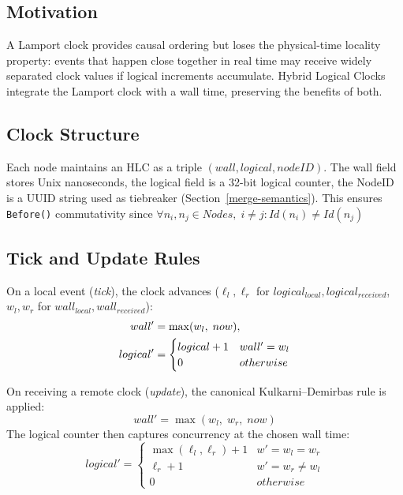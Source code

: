 \documentclass[conference]{IEEEtran}
\begin{document}
\subsection{Motivation}

A Lamport clock \cite{lamport1978} provides causal ordering but loses the physical-time
locality property: events that happen close together in real time may receive
widely separated clock values if logical increments accumulate. Hybrid Logical
Clocks \cite{kulkarni2014} integrate the Lamport clock with a wall time,
preserving the benefits of both.

\subsection{Clock Structure}

{\color{violet}Each node maintains an HLC as a triple $(wall, logical, nodeID)$}. The wall field stores
Unix nanoseconds, the logical field is a 32-bit logical counter, the NodeID is a UUID
string used as tiebreaker (Section~\ref{merge-semantics}). This ensures \texttt{Before()}
commutativity since $\forall n_i, n_j\in Nodes,\; i\neq j: Id(n_i) \neq Id(n_j)$

\subsection{Tick and Update Rules}

On a local event (\emph{tick}), the clock advances ($\ell_l, \ell_r$ for
$logical_{local}, logical_{received}$, $w_l, w_r$ for $wall_{local}, wall_{received}$):
\begin{align}
  wall' &= \max(w_l,\; now), \notag \\
  logical' &=
  \begin{cases}
    logical + 1 & wall' = w_l \\
    0           & otherwise
  \end{cases}
\end{align}

On receiving a remote clock (\emph{update}), the canonical
Kulkarni--Demirbas rule \cite{kulkarni2014} is applied:
\begin{equation}
  wall' = \max(w_l,\; w_r,\; now)
\end{equation}
The logical counter then captures concurrency at the chosen wall time:
\begin{equation}
  logical' =
  \begin{cases}
    \max(\ell_l, \ell_r) + 1 & w' = w_l = w_r \\
    \ell_r + 1                 & w' = w_r \neq w_l \\
    0                          & otherwise
  \end{cases}
\end{equation}
\end{document}
